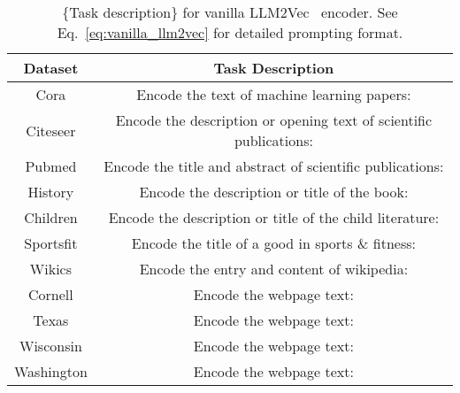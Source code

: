 \begin{table}[h]
\small
\centering
\begin{tabular}{@{}cc@{}}
\toprule
Dataset & Task Description \\ \midrule
Cora & Encode the text of machine learning papers: \\
Citeseer & Encode the description or opening text of scientific publications: \\
Pubmed & Encode the title and abstract of scientific publications: \\
History & Encode the description or title of the book: \\
Children & Encode the description or title of the child literature: \\
Sportsfit & Encode the title of a good in sports \& fitness: \\
Wikics & Encode the entry and content of wikipedia: \\
Cornell & Encode the webpage text: \\
Texas & Encode the webpage text: \\
Wisconsin & Encode the webpage text: \\
Washington & Encode the webpage text: \\ \bottomrule
\end{tabular}
\caption{\{Task description\} for vanilla LLM2Vec~\cite{li2024making} encoder. See Eq.~\ref{eq:vanilla_llm2vec} for detailed prompting format.}
\label{tab:llm2vec_task_description}
\end{table}